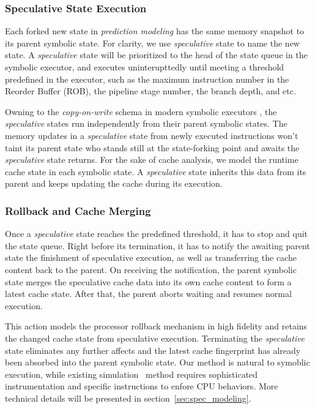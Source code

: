\documentclass[sigconf, review]{acmart}
\newcommand\ignore[1]{}
\begin{document}
\ignore{
However, different program inputs might go through various program paths to reach 
a same branch point but trigger divergent decisions. Thus, in practice speculative 
executions at these points do exist and our method complies with the fact.
}


\subsubsection{Speculative State Execution}
\label{sec:state_isolation}
Each forked new state in \textit{prediction modeling} has the same 
memory snapshot to its parent symbolic state. For clarity, we use 
\textit{speculative} state to name the new state. A \textit{speculative} 
state will be prioritized to the head of the state queue in the symbolic 
executor, and executes uninterupttedly until meeting a threshold predefined 
in the executor, such as the maximum instruction number in the Reorder Buffer
(ROB), the pipeline stage number, the branch depth, and etc. 


Owning to the \textit{copy-on-write} schema in modern symbolic executors
\cite{CadarDE08,CiorteaZBCC09}, the \textit{speculative} states run 
independently from their parent symbolic states. The memory updates in a 
\textit{speculative} state from newly executed instructions won't taint 
its parent state who stands still at the state-forking point and awaits 
the \textit{speculative} state returns. For the sake of cache analysis, we 
model the runtime cache state in each symbolic state. A \textit{speculative}
state inherits this data from its parent and keeps updating the cache during 
its execution.


\subsubsection{Rollback and Cache Merging}
Once a \textit{speculative} state reaches the predefined threshold, 
it has to stop and quit the state queue. Right before its termination, 
it has to notify the awaiting parent state the finishment of speculative 
execution, as well as transferring the cache content back to the parent. 
On receiving the notification, the parent symbolic state merges the 
speculative cache data into its own cache content to form a latest cache 
state. After that, the parent aborts waiting and resumes normal execution.


This action models the processor rollback mechanism in high fidelity
and retains the changed cache state from speculative execution. 
Terminating the \textit{speculative} state eliminates any further 
affects and the latest cache fingerprint has already been absorbed 
into the parent symbolic state. Our method is natural to symoblic
execution, while existing simulation~\cite{OleksenkoTSF19} method 
requires sophisticated instrumentation and specific instructions to 
enfore CPU behaviors. More technical details will be presented in 
section~\ref{sec:spec_modeling}.
\end{document}

